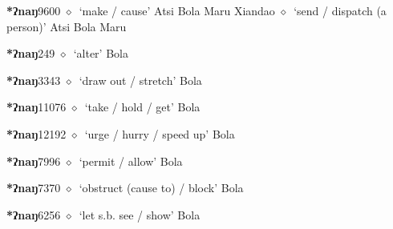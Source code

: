   \begin{list}{}{\leftmargin=1.5em \itemindent=-1.5em}
  \item {\footnotesize \textbf{*ʔnaŋ}}{\tiny 9600}
         $\diamond$~`make / cause'
         Atsi 
\hspace{1ex}
         Bola 
\hspace{1ex}
         Maru 
\hspace{1ex}
         Xiandao 
\hspace{1ex}
         $\diamond$~`send / dispatch (a person)'
         Atsi 
\hspace{1ex}
         Bola 
\hspace{1ex}
         Maru 
  \item {\footnotesize \textbf{*ʔnaŋ}}{\tiny 249}
\hspace{1ex}
         $\diamond$~`alter'
         Bola 
  \item {\footnotesize \textbf{*ʔnaŋ}}{\tiny 3343}
\hspace{1ex}
         $\diamond$~`draw out / stretch'
         Bola 
  \item {\footnotesize \textbf{*ʔnaŋ}}{\tiny 11076}
\hspace{1ex}
         $\diamond$~`take / hold / get'
         Bola 
  \item {\footnotesize \textbf{*ʔnaŋ}}{\tiny 12192}
\hspace{1ex}
         $\diamond$~`urge / hurry / speed up'
         Bola 
  \item {\footnotesize \textbf{*ʔnaŋ}}{\tiny 7996}
\hspace{1ex}
         $\diamond$~`permit / allow'
         Bola 
  \item {\footnotesize \textbf{*ʔnaŋ}}{\tiny 7370}
\hspace{1ex}
         $\diamond$~`obstruct (cause to) / block'
         Bola 
  \item {\footnotesize \textbf{*ʔnaŋ}}{\tiny 6256}
\hspace{1ex}
         $\diamond$~`let s.b. see / show'
         Bola 
  \end{list}
\item

